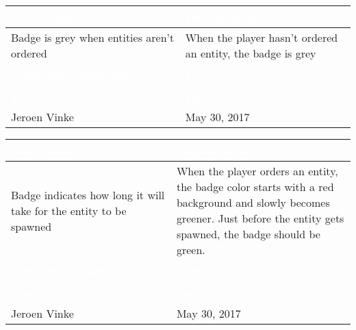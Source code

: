 \begin{tabularx}{\textwidth}{|X|X|}
\hline
\rowcolor{lightgray}\textcolor{white}{\textbf{Test scenario}} &
\textcolor{white}{\textbf{Desired result}}       
\\\hline
Badge is grey when entities aren't ordered & When the player hasn't ordered an entity, the badge is grey
\\\hline
\rowcolor{lightgray}\textcolor{white}{\textbf{Comments/suggestions}} & 
\textcolor{white}{\textbf{Passed}}
\\\hline
 & \cellcolor{green}                       
\\\hline
\rowcolor{lightgray}\textcolor{white}{\textbf{Tester}} & 
\textcolor{white}{\textbf{Date}}               
\\\hline
Jeroen Vinke & May 30, 2017     
                          		 
\\\hline
\end{tabularx}


\begin{tabularx}{\textwidth}{|X|X|}
\hline
\rowcolor{lightgray}\textcolor{white}{\textbf{Test scenario}} &
\textcolor{white}{\textbf{Desired result}}       
\\\hline
Badge indicates how long it will take for the entity to be spawned & When the player orders an entity, the badge color starts with a red background and slowly becomes greener. Just before the entity gets spawned, the badge should be green.
\\\hline
\rowcolor{lightgray}\textcolor{white}{\textbf{Comments/suggestions}} & 
\textcolor{white}{\textbf{Passed}}
\\\hline
 & \cellcolor{green}                       
\\\hline
\rowcolor{lightgray}\textcolor{white}{\textbf{Tester}} & 
\textcolor{white}{\textbf{Date}}               
\\\hline
Jeroen Vinke & May 30, 2017     
                          		 
\\\hline
\end{tabularx}